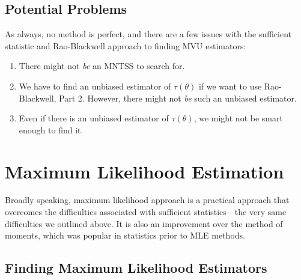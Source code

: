 \documentclass[a4paper,12pt]{scrartcl}
\begin{document}
\subsection{Potential Problems}

As always, no method is perfect, and there are a few issues with
the sufficient statistic and Rao-Blackwell approach to finding
MVU estimators:
\begin{enumerate}
   \item There might not \emph{be} an MNTSS to search for.
   \item We have to find an unbiased estimator of $\tau(\theta)$ if
      we want to use Rao-Blackwell, Part 2. However, there might
      not \emph{be} such an unbiased estimator.
   \item Even if there is an unbiased estimator of $\tau(\theta)$,
      we might not be smart enough to find it.
\end{enumerate}




\newpage

\section{Maximum Likelihood Estimation}

Broadly speaking, maximum likelihood approach is a practical approach
that overcomes the difficulties associated with sufficient
statistics---the very same difficulties we outlined above. It is also
an improvement over the method of moments, which was popular in
statistics prior to MLE methods.


\subsection{Finding Maximum Likelihood Estimators}
\end{document}
